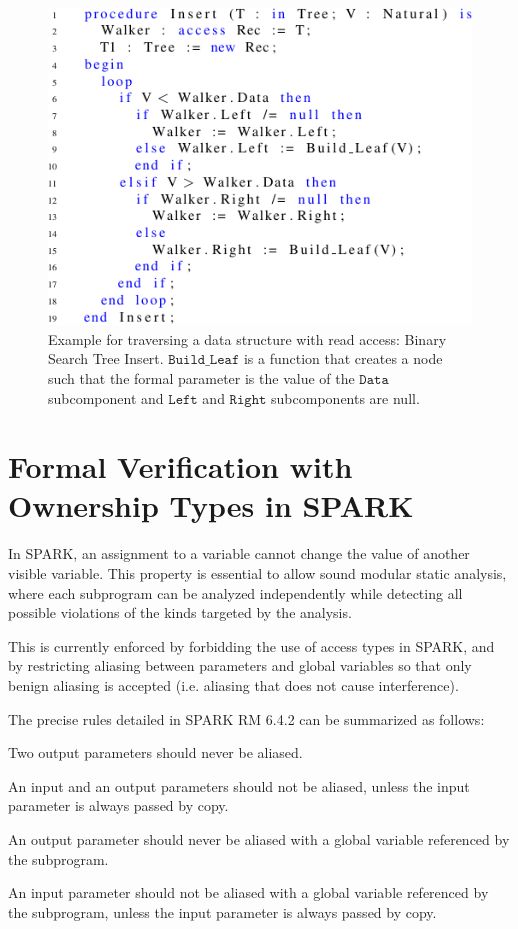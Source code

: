 \documentclass{llncs}
\newcommand\var[1]{\ensuremath{\mathtt{#1}}}
\begin{document}
\begin{figure}[htb!]
\centering
  \captionsetup{justification=centering,margin=0.6cm}
   \includegraphics[]{treeInsert}
   \caption{Example for traversing a data structure with read access: Binary Search Tree Insert. \var{Build\_Leaf} is a function that creates a node such that the formal
	parameter is the value of the \var{Data} subcomponent and \var{Left} and \var{Right} subcomponents are null.}
   \label{fig:treeInsert}
\end{figure}


\section{Formal Verification with Ownership Types in SPARK}

In SPARK, an assignment to a variable cannot change the value of another visible variable. This property is essential to allow sound modular static analysis,
where each subprogram can be analyzed independently while detecting all possible violations of the kinds targeted by the analysis.

\smallskip
This is currently enforced by forbidding the use of access types in SPARK, and by restricting aliasing between parameters and global variables so that only
benign aliasing is accepted (i.e. aliasing that does not cause interference).

\smallskip
The precise rules detailed in SPARK RM 6.4.2 can be summarized as follows:

\begin{compactitem}
  \item Two output parameters should never be aliased.
  \item An input and an output parameters should not be aliased, unless the input parameter is always passed by copy.
  \item An output parameter should never be aliased with a global variable referenced by the subprogram.
  \item An input parameter should not be aliased with a global variable referenced by the subprogram, unless the input parameter is always passed by copy.
\end{compactitem}
\end{document}
